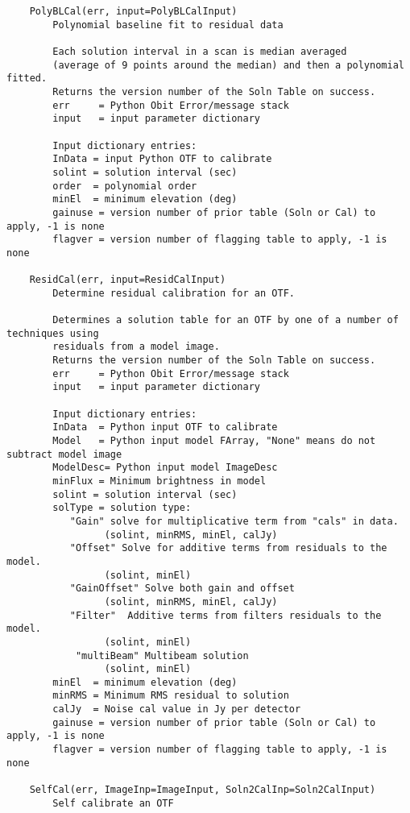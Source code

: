 \documentclass[11pt]{report}
\begin{document}
\begin{verbatim}
    PolyBLCal(err, input=PolyBLCalInput)
        Polynomial baseline fit to residual data
        
        Each solution interval in a scan is median averaged
        (average of 9 points around the median) and then a polynomial fitted.
        Returns the version number of the Soln Table on success.
        err     = Python Obit Error/message stack
        input   = input parameter dictionary
        
        Input dictionary entries:
        InData = input Python OTF to calibrate
        solint = solution interval (sec)
        order  = polynomial order
        minEl  = minimum elevation (deg)
        gainuse = version number of prior table (Soln or Cal) to apply, -1 is none
        flagver = version number of flagging table to apply, -1 is none
    
    ResidCal(err, input=ResidCalInput)
        Determine residual calibration for an OTF.
        
        Determines a solution table for an OTF by one of a number of techniques using
        residuals from a model image.
        Returns the version number of the Soln Table on success.
        err     = Python Obit Error/message stack
        input   = input parameter dictionary
        
        Input dictionary entries:
        InData  = Python input OTF to calibrate
        Model   = Python input model FArray, "None" means do not subtract model image
        ModelDesc= Python input model ImageDesc
        minFlux = Minimum brightness in model
        solint = solution interval (sec)
        solType = solution type:
           "Gain" solve for multiplicative term from "cals" in data.
                 (solint, minRMS, minEl, calJy)
           "Offset" Solve for additive terms from residuals to the model.
                 (solint, minEl)
           "GainOffset" Solve both gain and offset
                 (solint, minRMS, minEl, calJy)
           "Filter"  Additive terms from filters residuals to the model.
                 (solint, minEl)
            "multiBeam" Multibeam solution
                 (solint, minEl)
        minEl  = minimum elevation (deg)
        minRMS = Minimum RMS residual to solution
        calJy  = Noise cal value in Jy per detector 
        gainuse = version number of prior table (Soln or Cal) to apply, -1 is none
        flagver = version number of flagging table to apply, -1 is none
    
    SelfCal(err, ImageInp=ImageInput, Soln2CalInp=Soln2CalInput)
        Self calibrate an OTF
        

\end{verbatim}
\end{document}
